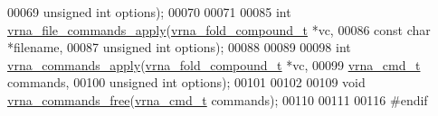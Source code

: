 \begin{DoxyCode}
00069                                    \textcolor{keywordtype}{unsigned} \textcolor{keywordtype}{int} options);
00070 
00071 
00085 \textcolor{keywordtype}{int} \hyperlink{group__command__files_gadbe8c9622f7bcc6dcbe3448b98df8656}{vrna\_file\_commands\_apply}(\hyperlink{group__fold__compound_structvrna__fc__s}{vrna\_fold\_compound\_t} *vc,
00086                              \textcolor{keyword}{const} \textcolor{keywordtype}{char}           *filename,
00087                              \textcolor{keywordtype}{unsigned} \textcolor{keywordtype}{int}         options);
00088 
00089 
00098 \textcolor{keywordtype}{int} \hyperlink{group__command__files_gac65d0fe86f7671a2d2b85dda1a3ddc16}{vrna\_commands\_apply}(\hyperlink{group__fold__compound_structvrna__fc__s}{vrna\_fold\_compound\_t}  *vc,
00099                         \hyperlink{group__command__files_gaf31afe4c5f8e4bf44a670ab4c3dcd916}{vrna\_cmd\_t}            commands,
00100                         \textcolor{keywordtype}{unsigned} \textcolor{keywordtype}{int}          options);
00101 
00102 
00109 \textcolor{keywordtype}{void} \hyperlink{group__command__files_ga3dc372dcbb43d2c4c91b5ef79b460428}{vrna\_commands\_free}(\hyperlink{group__command__files_gaf31afe4c5f8e4bf44a670ab4c3dcd916}{vrna\_cmd\_t} commands);
00110 
00111 
00116 \textcolor{preprocessor}{#endif}
\end{DoxyCode}
